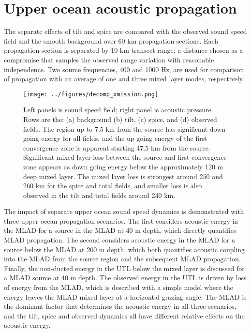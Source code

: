 \documentclass[preprint,NumberedRefs]{JASA}
\begin{document}
\section{\label{sec:propagation}Upper ocean acoustic propagation}
The separate effects of tilt and spice are compared with the observed sound speed field and the smooth background over 60 km propagation sections. Each propagation section is separated by 10 km transect range; a distance chosen as a compromise that samples the observed range variation with reasonable independence. Two source frequencies, 400 and 1000 Hz, are used for comparison of propagation with an average of one and three mixed layer modes, respectively.

\begin{figure}
\texttt{[image: ../figures/decomp\_xmission.png]}
    \caption{\label{fig:decomp_x}{Left panels is sound speed field; right panel is acoustic pressure. Rows are the: (a) background (b) tilt, (c) spice, and (d) observed fields. The region up to 7.5 km from the source has significant down going energy for all fields, and the up going energy of the first convergence zone is apparent starting 47.5 km from the source. Significant mixed layer loss between the source and first convergence zone appears as down going energy below the approximately 120 m deep mixed layer. The mixed layer loss is strongest around 250 and 260 km for the spice and total fields, and smaller loss is also observed in the tilt and total fields around 240 km.}}
\end{figure}

The impact of separate upper ocean sound speed dynamics is demonstrated with three upper ocean propagation scenarios. The first considers acoustic energy in the MLAD for a source in the MLAD at 40 m depth, which directly quantifies MLAD propagation. The second considers acoustic energy in the MLAD for a source below the MLAD at 200 m depth, which both quantifies acoustic coupling into the MLAD from the source region and the subsequent MLAD propagation. Finally, the non-ducted energy in the UTL below the mixed layer is discussed for a MLAD source at 40 m depth. The observed energy in the UTL is driven by loss of energy from the MLAD, which is described with a simple model where the energy leaves the MLAD mixed layer at a horizontal grazing angle. The MLAD is the dominant factor that determines the acoustic energy in all three scenarios, and the tilt, spice and observed dynamics all have different relative effects on the acoustic energy.
\end{document}
